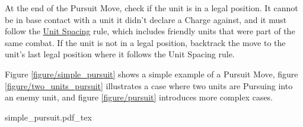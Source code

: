 At the end of the Pursuit Move, check if the unit is in a legal position. It cannot be in base contact with a unit it didn't declare a Charge against, and it must follow the \hyperref[unit_spacing]{Unit Spacing} rule, which includes friendly units that were part of the same combat. If the unit is not in a legal position, backtrack the move to the unit's last legal position where it follows the Unit Spacing rule.

Figure \ref{figure/simple_pursuit} shows a simple example of a Pursuit Move, figure \ref{figure/two_units_pursuit} illustrates a case where two units are Pursuing into an enemy unit, and figure \ref{figure/pursuit} introduces more complex cases.

\newcommand{\figSimplePursA}{a)}
\newcommand{\figSimplePursB}{b)}

\begin{Figure}
	\Fanchor
	\renewcommand{\figbiglettersize}{17}
	\def\svgwidth{\columnwidth}
	{simple_pursuit.pdf_tex}
	\caption{Simple example of a Pursuit.\captionposttitle
		a) Unit A Breaks from Combat. It Pivots to face away from unit B, and then moves the Flee Distance forwards.\captionpar
		b) Unit B Pursues. It does not need to Pivot as it is already facing the same direction as unit A, and moves the Pursuit Distance forwards.%
	}
	\label{figure/simple_pursuit}
\end{Figure}

\newcommand{\figTwoPursA}{a)}
\newcommand{\figTwoPursB}{b)}
\newcommand{\figTwoPursC}{c)}
\newcommand{\figTwoPursOne}{\Largefontsize{}\textbf{1}}
\newcommand{\figTwoPursTwo}{\Largefontsize{}\textbf{2}}
\newcommand{\figTwoPursunitA}{%
	\begin{minipage}{0.30\unitlength}\begin{center}%
		\normalfontsize{}Pursuit Distance\par Unit A%
	\end{center}\end{minipage}%
}
\newcommand{\figTwoPursunitB}{%
	\begin{minipage}{0.30\unitlength}\begin{center}%
		\normalfontsize{}Pursuit Distance\par Unit B%
	\end{center}\end{minipage}%
}
\newcommand{\figTwoPursunitC}{%
	\begin{minipage}{0.30\unitlength}\begin{center}%
		\normalfontsize{}Pursuit Distance\par Unit C%
	\end{center}\end{minipage}%
}
\newcommand{\figTwoPursunitD}{%
	\begin{minipage}{0.30\unitlength}\begin{center}%
		\normalfontsize{}Flee Distance\par Unit D%
	\end{center}\end{minipage}%
}

